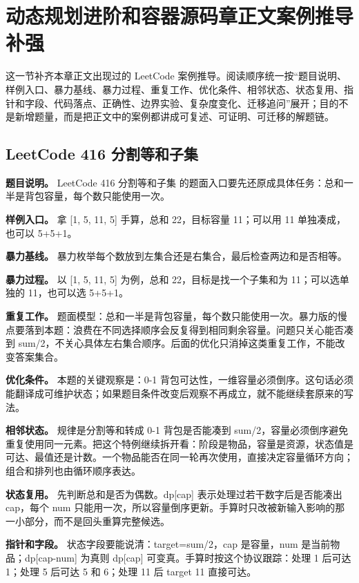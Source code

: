 \section{动态规划进阶和容器源码章正文案例推导补强}

这一节补齐本章正文出现过的 LeetCode 案例推导。阅读顺序统一按“题目说明、样例入口、暴力基线、暴力过程、重复工作、优化条件、相邻状态、状态复用、指针和字段、代码落点、正确性、边界实验、复杂度变化、迁移追问”展开；目的不是新增题量，而是把正文中的案例都讲成可复述、可证明、可迁移的解题链。

\subsection{LeetCode 416 分割等和子集}

\textbf{题目说明。} LeetCode 416 分割等和子集 的题面入口要先还原成具体任务：总和一半是背包容量，每个数只能使用一次。

\textbf{样例入口。} 拿 [1, 5, 11, 5] 手算，总和 22，目标容量 11；可以用 11 单独凑成，也可以 5+5+1。

\textbf{暴力基线。} 暴力枚举每个数放到左集合还是右集合，最后检查两边和是否相等。

\textbf{暴力过程。} 以 [1, 5, 11, 5] 为例，总和 22，目标是找一个子集和为 11；可以选单独的 11，也可以选 5+5+1。

\textbf{重复工作。} 题面模型：总和一半是背包容量，每个数只能使用一次。暴力版的慢点要落到本题：浪费在不同选择顺序会反复得到相同剩余容量。问题只关心能否凑到 sum/2，不关心具体左右集合顺序。后面的优化只消掉这类重复工作，不能改变答案集合。

\textbf{优化条件。} 本题的关键观察是：0-1 背包可达性，一维容量必须倒序。这句话必须能翻译成可维护状态；如果题目条件改变后观察不再成立，就不能继续套原来的写法。

\textbf{相邻状态。} 规律是分割等和转成 0-1 背包是否能凑到 sum/2，容量必须倒序避免重复使用同一元素。把这个特例继续拆开看：阶段是物品，容量是资源，状态值是可达、最值还是计数。一个物品能否在同一轮再次使用，直接决定容量循环方向；组合和排列也由循环顺序表达。

\textbf{状态复用。} 先判断总和是否为偶数。dp[cap] 表示处理过若干数字后是否能凑出 cap，每个 num 只能用一次，所以容量倒序更新。手算时只改被新输入影响的那一小部分，而不是回头重算完整候选。

\textbf{指针和字段。} 状态字段要能说清：target=sum/2，cap 是容量，num 是当前物品；dp[cap-num] 为真则 dp[cap] 可变真。手算时按这个协议跟踪：处理 1 后可达 1；处理 5 后可达 5 和 6；处理 11 后 target 11 直接可达。

